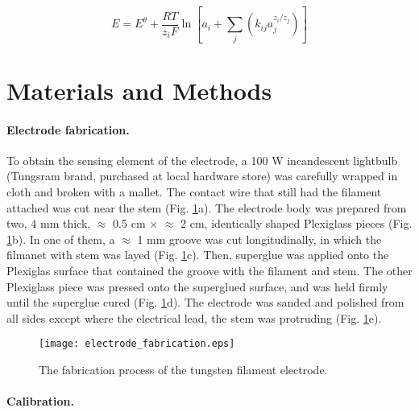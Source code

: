 \documentclass[manuscript=article, journal=jceda8]{achemso}
\begin{document}
\begin{equation}
E=E^\theta + \frac{RT}{z_iF} \ln \left [ a_i + \sum_{j} \left ( k_{ij}a_j^{z_i/z_j} \right ) \right ]
\end{equation}


\section{Materials and Methods}
\paragraph{Electrode fabrication.}

To obtain the sensing element of the electrode, a 100 W incandescent lightbulb (Tungsram brand, purchased at local hardware store) was carefully wrapped in cloth and broken with a mallet. The contact wire that still had the filament attached was cut near the stem (Fig. \ref{fig:fabrication}a). The electrode body was prepared from two, 4 mm thick, $\approx$ 0.5 cm $\times$ $\approx$ 2 cm, identically shaped Plexiglass pieces (Fig. \ref{fig:fabrication}b). In one of them, a $\approx$ 1 mm groove was cut longitudinally, in which the filmanet with stem was layed (Fig. \ref{fig:fabrication}c). Then, superglue was applied onto the Plexiglas surface that contained the groove with the filament and stem. The other Plexiglass piece was pressed onto the superglued surface, and was held firmly until the superglue cured (Fig. \ref{fig:fabrication}d). The electrode was sanded and polished from all sides except where the electrical lead, the stem was protruding (Fig. \ref{fig:fabrication}e).

\begin{figure}
\centering
\texttt{[image: electrode\_fabrication.eps]}
\caption{The fabrication process of the tungsten filament electrode. }
\label{fig:fabrication}
\end{figure}

\paragraph{Calibration.}
\end{document}

